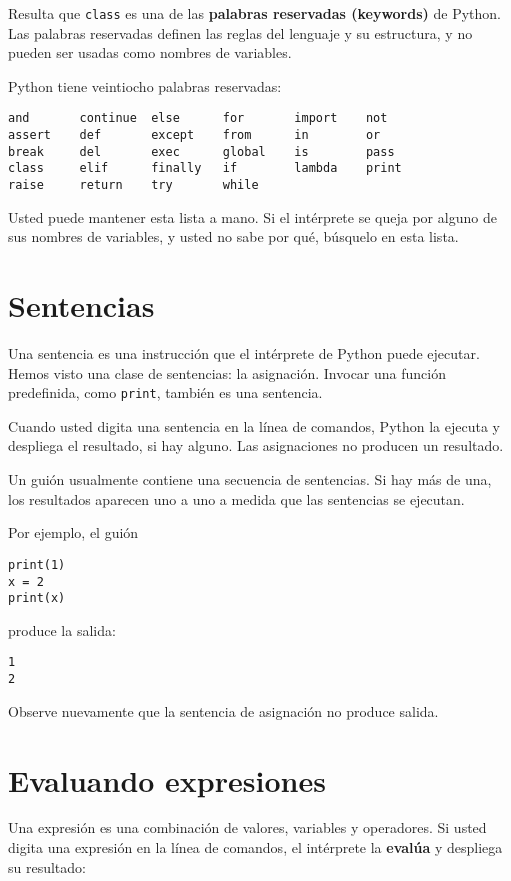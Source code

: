 Resulta que \texttt{class} es una de las \textbf{palabras reservadas
(keywords)} de Python. Las palabras reservadas definen las reglas
del lenguaje y su estructura, y no pueden ser usadas como nombres
de variables.


Python tiene veintiocho palabras reservadas:

\begin{lstlisting}
and       continue  else      for       import    not       
assert    def       except    from      in        or        
break     del       exec      global    is        pass      
class     elif      finally   if        lambda    print     
raise     return    try       while
\end{lstlisting}
 

Usted puede mantener esta lista a mano. Si el intérprete se queja
por alguno de sus nombres de variables, y usted no sabe por qué, búsquelo
en esta lista.

\section{Sentencias}

Una sentencia es una instrucción que el intérprete de Python puede
ejecutar. Hemos visto una clase de sentencias: la asignación. Invocar
una función predefinida, como \texttt{print}, también es una sentencia.

Cuando usted digita una sentencia en la línea de comandos, Python
la ejecuta y despliega el resultado, si hay alguno. Las asignaciones
no producen un resultado.

Un guión usualmente contiene una secuencia de sentencias. Si hay más
de una, los resultados aparecen uno a uno a medida que las sentencias
se ejecutan.

Por ejemplo, el guión

\begin{lstlisting}
print(1)
x = 2
print(x)
\end{lstlisting}
 produce la salida:
\begin{verbatim}
1
2
\end{verbatim}
Observe nuevamente que la sentencia de asignación no produce salida.

\section{Evaluando expresiones}

Una expresión es una combinación de valores, variables y operadores.
Si usted digita una expresión en la línea de comandos, el intérprete
la \textbf{evalúa} y despliega su resultado:


